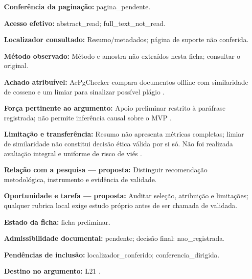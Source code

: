 \noindent\textbf{Conferência da paginação:} pagina\_pendente.\par\medskip

\noindent\textbf{Acesso efetivo:} abstract\_read; full\_text\_not\_read.\par\medskip

\noindent\textbf{Localizador consultado:} Resumo/metadados; página de suporte não conferida.\par\medskip

\noindent\textbf{Método observado:} Método e amostra não extraídos nesta ficha; consultar o original.\par\medskip

\noindent\textbf{Achado atribuível:} AcPgChecker compara documentos offline com similaridade de cosseno e um limiar para sinalizar possível plágio \citep{SU08}.\par\medskip

\noindent\textbf{Força pertinente ao argumento:} Apoio preliminar restrito à paráfrase registrada; não permite inferência causal sobre o MVP \citep{SU08}.\par\medskip

\noindent\textbf{Limitação e transferência:} Resumo não apresenta métricas completas; limiar de similaridade não constitui decisão ética válida por si só. Não foi realizada avaliação integral e uniforme de risco de viés \citep{SU08}.\par\medskip

\noindent\textbf{Relação com a pesquisa — proposta:} Distinguir recomendação metodológica, instrumento e evidência de validade.\par\medskip

\noindent\textbf{Oportunidade e tarefa — proposta:} Auditar seleção, atribuição e limitações; qualquer rubrica local exige estudo próprio antes de ser chamada de validada.\par\medskip

\noindent\textbf{Estado da ficha:} ficha preliminar.\par\medskip

\noindent\textbf{Admissibilidade documental:} pendente; decisão final: nao\_registrada.\par\medskip

\noindent\textbf{Pendências de inclusão:} localizador\_conferido; conferencia\_dirigida.\par\medskip

\noindent\textbf{Destino no argumento:} L21 .

